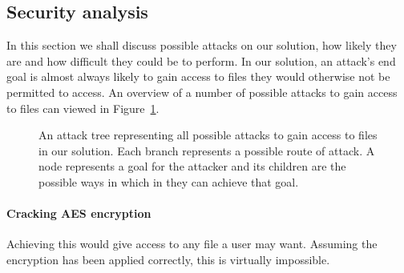 \documentclass[12pt, titlepage]{article}
\begin{document}
\subsection{Security analysis}
In this section we shall discuss possible attacks on our solution, how likely they are and how difficult they could be to perform.
\newline \indent In our solution, an attack's end goal is almost always likely to gain access to files they would otherwise not be permitted to access.
\newline \indent An overview of a number of possible attacks to gain access to files can viewed in Figure~\ref{fig:attackTree}.

\begin{landscape}
\begin{figure}

\caption{An attack tree representing all possible attacks to gain access to files in our solution. Each branch represents a possible route of attack. A node represents a goal for the attacker and its children are the possible ways in which in they can achieve that goal.}
\label{fig:attackTree}
\end{figure}
\end{landscape}

\paragraph*{Cracking AES encryption} Achieving this would give access to any file a user may want. Assuming the encryption has been applied correctly, this is virtually impossible.
\end{document}
